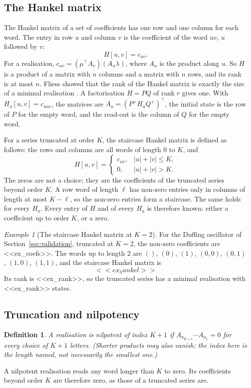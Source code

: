\documentclass[11pt,a4paper]{article}
\newtheorem{definition}{Definition}
\theoremstyle{remark}
\newtheorem{example}{Example}
\begin{document}
\subsection{The Hankel matrix}
The Hankel matrix of a set of coefficients has one row and one column for each word.
The entry in row $u$ and column $v$ is the coefficient of the word $uv$, $u$ followed by $v$:
\begin{equation}
H[u,v]=c_{uv}.
\end{equation}
For a realisation, $c_{uv}=(\mu^\top A_v)(A_u\lambda)$, where $A_u$ is the product along $u$.
So $H$ is a product of a matrix with $n$ columns and a matrix with $n$ rows, and its rank is at most $n$.
Fliess showed that the rank of the Hankel matrix is exactly the size of a minimal realisation \cite{Fliess1974}.
A factorisation $H=PQ$ of rank $r$ gives one.
With $H_a[u,v]=c_{uav}$, the matrices are $A_a=(P^+H_aQ^+)^\top$, the initial state is the row of $P$ for the empty word, and the read-out is the column of $Q$ for the empty word.

For a series truncated at order $K$, the staircase Hankel matrix is defined as follows: the rows and columns are all words of length $0$ to $K$, and
\begin{equation}
H[u,v]=\begin{cases} c_{uv}, & |u|+|v|\le K,\\ 0, & |u|+|v|>K.\end{cases}
\end{equation}
The zeros are not a choice; they are the coefficients of the truncated series beyond order $K$.
A row word of length $\ell$ has non-zero entries only in columns of length at most $K-\ell$, so the non-zero entries form a staircase.
The same holds for every $H_a$.
Every entry of $H$ and of every $H_a$ is therefore known: either a coefficient up to order $K$, or a zero.

\begin{example}[The staircase Hankel matrix at $K=2$]\label{ex:hankel}
For the Duffing oscillator of Section~\ref{sec:validation}, truncated at $K=2$, the non-zero coefficients are
<<ex_coefs>>.
The words up to length 2 are $()$, $(0)$, $(1)$, $(0,0)$, $(0,1)$, $(1,0)$, $(1,1)$, and the staircase Hankel matrix is
\[
<<ex_hankel>>
\]
Its rank is <<ex_rank>>, so the truncated series has a minimal realisation with <<ex_rank>> states.
\end{example}

\subsection{Truncation and nilpotency}
\begin{definition}
A realisation is \emph{nilpotent of index $K+1$} if $A_{a_{K+1}}\cdots A_{a_1}=0$ for every choice of $K+1$ letters. (Shorter products may also vanish; the index here is the length named, not necessarily the smallest one.)
\end{definition}
A nilpotent realisation reads any word longer than $K$ to zero.
Its coefficients beyond order $K$ are therefore zero, as those of a truncated series are.
\end{document}
